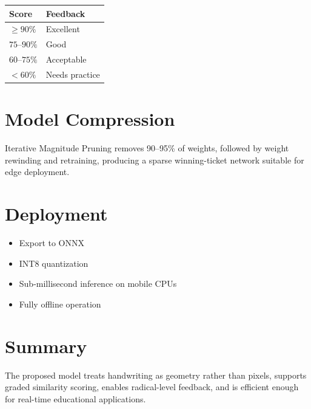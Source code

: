 \documentclass[11pt]{article}
\begin{document}
\begin{center}
\begin{tabular}{ll}
\toprule
Score & Feedback \\
\midrule
$\geq 90\%$ & Excellent \\
$75$--$90\%$ & Good \\
$60$--$75\%$ & Acceptable \\
$<60\%$ & Needs practice \\
\bottomrule
\end{tabular}
\end{center}

\section{Model Compression}
Iterative Magnitude Pruning removes 90--95\% of weights, followed by weight rewinding and retraining, producing a sparse winning-ticket network suitable for edge deployment.

\section{Deployment}
\begin{itemize}
\item Export to ONNX
\item INT8 quantization
\item Sub-millisecond inference on mobile CPUs
\item Fully offline operation
\end{itemize}

\section{Summary}
The proposed model treats handwriting as geometry rather than pixels, supports graded similarity scoring, enables radical-level feedback, and is efficient enough for real-time educational applications.
\end{document}
